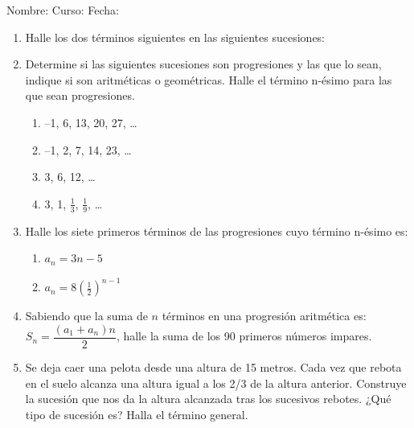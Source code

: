 \documentclass[fleqn]{article}
\newcommand{\LineaNombre}{%
\par
\vspace{\baselineskip}
Nombre:\hrulefill \; Curso: \underline{\hspace*{48pt}} \; Fecha: \underline{\hspace*{2.5cm}} \relax
\par}
\begin{document}
\LineaNombre
\begin{enumerate}
 \item Halle los dos términos siguientes en las siguientes sucesiones:
 \begin{enumerate}
 \end{enumerate}
 \item Determine si las siguientes sucesiones son progresiones y las que lo sean, indique si son aritméticas o geométricas. Halle el término n-ésimo para las que sean progresiones.
 \begin{enumerate}
 \item --1, 6, 13, 20, 27, \ldots \noanswer
 \item --1, 2, 7, 14, 23, \ldots \noanswer
 \item 3, 6, 12, \ldots \noanswer
 \item 3, 1, $\frac{1}{3}$, $\frac{1}{9}$, \ldots \noanswer
 \end{enumerate}
 \item Halle los siete primeros términos de las progresiones cuyo término n-ésimo es:
 \begin{enumerate}
 \item $a_{n}=3n-5$\noanswer[0.25in]
 \item $a_{n}=8(\frac{1}{2})^{n-1}$ \noanswer[0.25in]
 \end{enumerate}
 \newpage
 \item Sabiendo que la suma de $n$ términos en una progresión aritmética es: $S_{n}=\dfrac{(a_{1}+a_{n})n}{2}$, halle la suma de los 90 primeros números impares.\noanswer
 \item Se deja caer una pelota desde una altura de 15 metros. Cada vez que rebota en el suelo alcanza una altura igual a los 2/3 de la altura anterior. Construye la sucesión que nos da la altura alcanzada tras los sucesivos rebotes. ¿Qué tipo de sucesión es? Halla el término general.\noanswer
 \end{enumerate}
\end{document}
